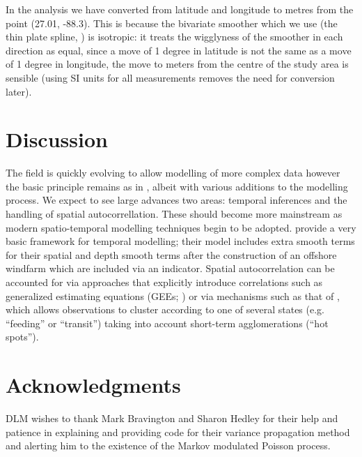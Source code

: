 \documentclass[a4paper,12pt]{article}
\begin{document}
%

In the analysis we have converted from latitude and longitude to metres from the point (27.01, -88.3). This is because the bivariate smoother which we use (the thin plate spline, \cite{Wood:2003tc}) is isotropic: it treats the wigglyness of the smoother in each direction as equal, since a move of 1 degree in latitude is not the same as a move of 1 degree in longitude, the move to meters from the centre of the study area is sensible (using SI units for all measurements removes the need for conversion later).

\section*{Discussion}
\label{s:discussion}

The field is quickly evolving to allow modelling of more complex data however the basic principle remains as in \cite{Hedley:2004et}, albeit with various additions to the modelling process. We expect to see large advances two areas: temporal inferences and the handling of spatial autocorrellation. These should become more mainstream as modern spatio-temporal modelling techniques begin to be adopted. \cite{Petersen:2011vy} provide a very basic framework for temporal modelling; their model includes extra smooth terms for their spatial and depth smooth terms after the construction of an offshore windfarm which are included via an indicator. Spatial autocorrelation can be accounted for via approaches that explicitly introduce correlations such as generalized estimating equations (GEEs; \cite{Hardin:2003uf}) or via mechanisms such as that of \cite{Skaug:2006gs}, which allows observations to cluster according to one of several states (e.g. ``feeding'' or ``transit'') taking into account short-term agglomerations (``hot spots'').



\section*{Acknowledgments}

DLM wishes to thank Mark Bravington and Sharon Hedley for their help and patience in explaining and providing code for their variance propagation method and alerting him to the existence of the Markov modulated Poisson process.
\end{document}

